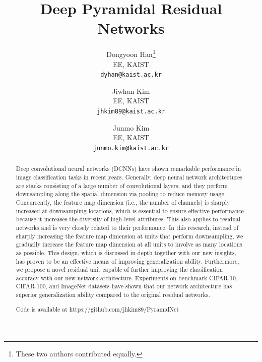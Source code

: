 \documentclass[10pt,twocolumn,letterpaper]{article}
\begin{document}
\title{Deep Pyramidal Residual Networks}

\author{Dongyoon Han\thanks{These two authors contributed equally.}\\
EE, KAIST\\
{\tt\small dyhan@kaist.ac.kr}
\and
Jiwhan Kim\footnotemark[1]\\
EE, KAIST\\
{\tt\small jhkim89@kaist.ac.kr}
\and
Junmo Kim\\
EE, KAIST\\
{\tt\small junmo.kim@kaist.ac.kr}
}
\maketitle

\begin{abstract}
 Deep convolutional neural networks (DCNNs) have shown remarkable performance in image classification tasks in recent years. Generally, deep neural network architectures are stacks consisting of a large number of convolutional layers, and they perform downsampling along the spatial dimension via pooling to reduce memory usage. Concurrently, the feature map dimension (i.e., the number of channels) is sharply increased at downsampling locations, which is essential to ensure effective performance because it increases the diversity of high-level attributes. This also applies to residual networks and is very closely related to their performance. In this research, instead of sharply increasing the feature map dimension at units that perform downsampling, we gradually increase the feature map dimension at all units to involve as many locations as possible. This design, which is discussed in depth together with our new insights, has proven to be an effective means of improving generalization ability. Furthermore, we propose a novel residual unit capable of further improving the classification accuracy with our new network architecture. Experiments on benchmark CIFAR-10, CIFAR-100, and ImageNet datasets have shown that our network architecture has superior generalization ability compared to the original residual networks.

 {\small Code is available at https://github.com/jhkim89/PyramidNet}
\end{abstract}
\end{document}
